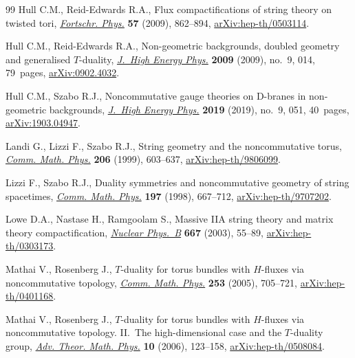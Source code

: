 \documentclass[pdftex]{sigma}
\numberwithin{equation}{section}
\begin{document}
\begin{thebibliography}{99}
Hull C.M., Reid-Edwards R.A., Flux compactifications of string theory on
 twisted tori, \href{https://doi.org/10.1002/prop.200900076}{\textit{Fortschr. Phys.}} \textbf{57} (2009), 862--894,
 \href{https://arxiv.org/abs/hep-th/0503114}{arXiv:hep-th/0503114}.

Hull C.M., Reid-Edwards R.A., Non-geometric backgrounds, doubled geometry and
 generalised {$T$}-duality, \href{https://doi.org/10.1088/1126-6708/2009/09/014}{\textit{J.~High Energy Phys.}} \textbf{2009}
 (2009), no.~9, 014, 79~pages, \href{https://arxiv.org/abs/0902.4032}{arXiv:0902.4032}.

Hull C.M., Szabo R.J., Noncommutative gauge theories on {D}-branes in
 non-geometric backgrounds, \href{https://doi.org/10.1007/jhep09(2019)051}{\textit{J.~High Energy Phys.}} \textbf{2019}
 (2019), no.~9, 051, 40~pages, \href{https://arxiv.org/abs/1903.04947}{arXiv:1903.04947}.

Landi G., Lizzi F., Szabo R.J., String geometry and the noncommutative torus,
 \href{https://doi.org/10.1007/s002200050839}{\textit{Comm. Math. Phys.}} \textbf{206} (1999), 603--637,
 \href{https://arxiv.org/abs/hep-th/9806099}{arXiv:hep-th/9806099}.

Lizzi F., Szabo R.J., Duality symmetries and noncommutative geometry of string
 spacetimes, \href{https://doi.org/10.1007/s002200050468}{\textit{Comm. Math. Phys.}} \textbf{197} (1998), 667--712,
 \href{https://arxiv.org/abs/hep-th/9707202}{arXiv:hep-th/9707202}.

Lowe D.A., Nastase H., Ramgoolam S., Massive {IIA} string theory and matrix
 theory compactification, \href{https://doi.org/10.1016/S0550-3213(03)00547-9}{\textit{Nuclear Phys.~B}} \textbf{667} (2003),
 55--89, \href{https://arxiv.org/abs/hep-th/0303173}{arXiv:hep-th/0303173}.

Mathai V., Rosenberg J., {$T$}-duality for torus bundles with {$H$}-fluxes via
 noncommutative topology, \href{https://doi.org/10.1007/s00220-004-1159-7}{\textit{Comm. Math. Phys.}} \textbf{253} (2005),
 705--721, \href{https://arxiv.org/abs/hep-th/0401168}{arXiv:hep-th/0401168}.

Mathai V., Rosenberg J., {$T$}-duality for torus bundles with {$H$}-fluxes via
 noncommutative topology. {II}.~{T}he high-dimensional case and the
 {$T$}-duality group, \href{https://doi.org/10.4310/ATMP.2006.v10.n1.a5}{\textit{Adv. Theor. Math. Phys.}} \textbf{10} (2006),
 123--158, \href{https://arxiv.org/abs/hep-th/0508084}{arXiv:hep-th/0508084}.


\end{thebibliography}
\end{document}
